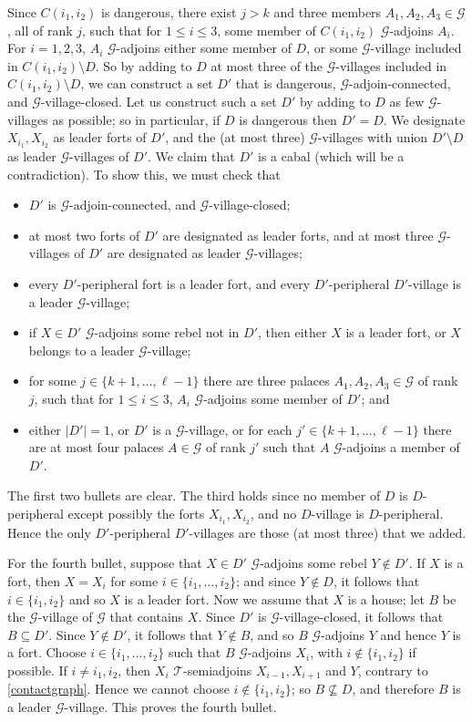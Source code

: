 \documentclass[10pt,a4paper]{amsart}
\theoremstyle{plain}
\def\LL{,\ldots,}
\newcommand{\mac}{\mathcal}
\def\LL{,\ldots,}
\newcommand{\mac}{\mathcal}
\begin{document}
	Since $C(i_1,i_2)$ is dangerous, there exist $j>k$ and three members $A_1,A_2,A_3\in \mac G$, all of rank $j$, such that for $1\le i\le 3$, some member of $C(i_1,i_2)$
	$\mac G$-adjoins  $A_i$.
	For $i = 1,2,3$, $A_i$ $\mac G$-adjoins either some member of $D$, or some $\mac G$-village
	included in $C(i_1,i_2)\setminus D$.
	So by adding to $D$ at most three of the $\mac G$-villages included in $C(i_1,i_2)\setminus D$, we can construct  a set $D'$ that is dangerous,
	$\mac G$-adjoin-connected, and $\mac G$-village-closed. Let us construct such a set $D'$ by adding to $D$ as few $\mac G$-villages as possible;  so in particular, if $D$ is dangerous then $D'=D$.
	We designate $X_{i_1}, X_{i_2}$ as leader forts of $D'$, and the (at most three) $\mac G$-villages with union $D'\setminus D$ as leader $\mac G$-villages of $D'$.
	We claim that $D'$ is a cabal (which will be a contradiction). To show this, we must check that
	\begin{itemize}
		\item $D'$ is $\mac G$-adjoin-connected, and $\mac G$-village-closed;
		\item at most two forts of $D'$ are designated as leader forts, and at most three $\mac G$-villages of $D'$ are designated as
		leader $\mac G$-villages;
		\item every $D'$-peripheral fort is a leader fort, and every $D'$-peripheral $D'$-village is a leader $\mac G$-village;
		\item if $X\in D'$ $\mac G$-adjoins some rebel not in $D'$, then either $X$ is a leader fort, or $X$ belongs to a leader $\mac G$-village;
		\item for some $j\in \{k+1\LL \ell-1\}$ there are three palaces $A_1,A_2,A_3\in \mac G$ of rank $j$, such that for $1\le i\le 3$,
		$A_i$ $\mac G$-adjoins some member of $D'$; and
		\item either $|D'|=1$, or $D'$ is a $\mac G$-village, or for each $j'\in \{k+1\LL \ell-1\}$ there are at most four palaces $A\in \mac G$ of rank $j'$ such that
		$A$ $\mac G$-adjoins a member of $D'$.
	\end{itemize}
	The first two bullets are clear.
	The third holds since no member of $D$ is $D$-peripheral except possibly the forts $X_{i_1}, X_{i_2}$, and no $D$-village is $D$-peripheral. Hence the only $D'$-peripheral $D'$-villages are those (at most three) that we added.
	
	For the fourth bullet, suppose that $X\in D'$ $\mac G$-adjoins some rebel $Y\notin D'$.
	If $X$ is a fort, then $X=X_i$ for some $i\in \{i_1\LL i_2\}$; and since $Y\notin D$, it follows that $i\in\{i_1,i_2\}$  and so $X$ is a leader fort.
	Now we assume that $X$ is a house;  let $B$ be the $\mac G$-village of $\mac G$ that contains $X$. Since $D'$
	is $\mac G$-village-closed, it follows that $B\subseteq D'$. Since $Y\notin D'$, it follows that $Y\notin B$, and so $B$ $\mac G$-adjoins $Y$ and hence $Y$
	is a fort. Choose $i\in \{i_1\LL i_2\}$ such that $B$ $\mac G$-adjoins $X_i$, with $i\notin \{i_1,i_2\}$ if possible.
	If $i\ne i_1,i_2$, then $X_i$ $\mac T$-semiadjoins $X_{i-1}, X_{i+1}$ and $Y$, contrary to \ref{contactgraph}.
	Hence we cannot choose $i\notin \{i_1,i_2\}$; so $B\not\subseteq D$, and therefore $B$ is a leader $\mac G$-village.
	This proves the fourth bullet.
	
\end{document}
